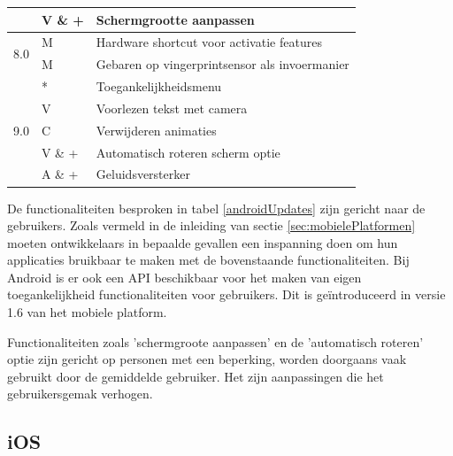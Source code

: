 \begin{table}[h]
\begin{tabular}{|l|l|l|}
        \cline{2-3}
        & V \& +          & Schermgrootte aanpassen                           \\ 
        \hline
        \multirow{2}{*}{8.0}  & M~              & Hardware shortcut voor activatie features         \\ 
        \cline{2-3}
        & M               & Gebaren op vingerprintsensor als invoermanier     \\ 
        \hline
        \multirow{5}{*}{9.0}  & *               & Toegankelijkheidsmenu                             \\ 
        \cline{2-3}
        & V               & Voorlezen tekst met camera                        \\ 
        \cline{2-3}
        & C               & Verwijderen animaties                       \\ 
        \cline{2-3}
        & V \& +               & Automatisch roteren scherm optie                       \\ 
        \cline{2-3}
        & A \& +          & Geluidsversterker~                                \\
        \hline
    \end{tabular}

 \end{table}


De functionaliteiten besproken in tabel \ref{androidUpdates} zijn gericht naar de gebruikers. Zoals vermeld in de inleiding van sectie \ref{sec:mobielePlatformen} moeten ontwikkelaars in bepaalde gevallen een inspanning doen om hun applicaties bruikbaar te maken met de bovenstaande functionaliteiten. Bij Android is er ook een \gls{API} beschikbaar voor het maken van eigen toegankelijkheid functionaliteiten voor gebruikers. Dit is geïntroduceerd in versie 1.6 van het mobiele platform. 

Functionaliteiten zoals 'schermgroote aanpassen' en de 'automatisch roteren' optie zijn gericht op personen met een beperking, worden doorgaans vaak gebruikt door de gemiddelde gebruiker. Het zijn aanpassingen die het gebruikersgemak verhogen.
\newpage
\subsection{iOS}
\label{sec:iOS}


